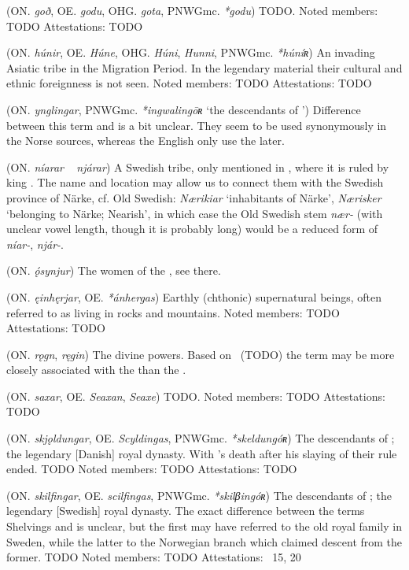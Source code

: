 \begin{itemize}
 (ON. \emph{goð}, OE. \emph{godu}, OHG. \emph{gota}, PNWGmc. \emph{*godu})
  TODO.
  Noted members: TODO
  Attestations: TODO

 (ON. \emph{húnir}, OE. \emph{Húne}, OHG. \emph{Húni}, \emph{Hunni}, PNWGmc. \emph{*húníʀ})
  An invading Asiatic tribe in the Migration Period. In the legendary material their cultural and ethnic foreignness is not seen.
  Noted members: TODO
  Attestations: TODO

 (ON. \emph{ynglingar}, PNWGmc. \emph{*ingwalingōʀ} ‘the descendants of ’)
  Difference between this term and  is a bit unclear. They seem to be used synonymously in the Norse sources, whereas the English only use the later.

 (ON. \emph{níarar} ~ \emph{njárar})
  A Swedish tribe, only mentioned in \Volundarkvida, where it is ruled by king . The name and location may allow us to connect them with the Swedish province of Närke, cf. Old Swedish: \emph{Nærikiar} ‘inhabitants of Närke’, \emph{Nærisker} ‘belonging to Närke; Nearish’, in which case the Old Swedish stem \emph{nær-} (with unclear vowel length, though it is probably long) would be a reduced form of \emph{níar-}, \emph{njár-}.

 (ON. \emph{ǫ́synjur})
  The women of the , see there.

 (ON. \emph{ęinhęrjar}, OE. \emph{*ánhergas})
  Earthly (chthonic) supernatural beings, often referred to as living in rocks and mountains.
  Noted members: TODO
  Attestations: TODO

 (ON. \emph{rǫgn}, \emph{ręgin})
  The divine powers. Based on \Vafthrudnismal\ (TODO) the term may be more closely associated with the  than the .

 (ON. \emph{saxar}, OE. \emph{Seaxan}, \emph{Seaxe})
  TODO.
  Noted members: TODO
  Attestations: TODO

 (ON. \emph{skjǫldungar}, OE. \emph{Scyldingas}, PNWGmc. \emph{*skeldungóʀ})
  The descendants of ; the legendary [Danish] royal dynasty. With ’s death after his slaying of  their rule ended. TODO
  Noted members: TODO
  Attestations: TODO

 (ON. \emph{skilfingar}, OE. \emph{scilfingas}, PNWGmc. \emph{*skilβingóʀ})
  The descendants of ; the legendary [Swedish] royal dynasty. The exact difference between the terms Shelvings and  is unclear, but the first may have referred to the old royal family in Sweden, while the latter to the Norwegian branch which claimed descent from the former. TODO
  Noted members: TODO
  Attestations: \Hyndluljod\ 15, 20


\end{itemize}
